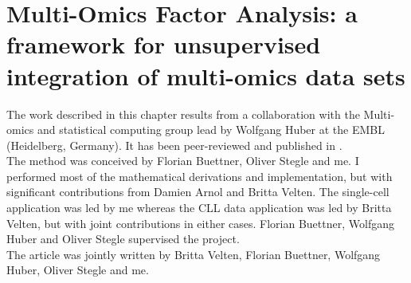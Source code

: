 \graphicspath{{Chapter2/Figs/}}

\section{Multi-Omics Factor Analysis: a framework for unsupervised integration of multi-omics data sets}

The work described in this chapter results from a collaboration with the Multi-omics and statistical computing group lead by Wolfgang Huber at the EMBL (Heidelberg, Germany). It has been peer-reviewed and published in \cite{Argelaguet2018}.\\

The method was conceived by Florian Buettner, Oliver Stegle and me. I performed most of the mathematical derivations and implementation, but with significant contributions from Damien Arnol and Britta Velten. The single-cell application was led by me whereas the CLL data application was led by Britta Velten, but with joint contributions in either cases. Florian Buettner, Wolfgang Huber and Oliver Stegle supervised the project.\\
The article was jointly written by Britta Velten, Florian Buettner, Wolfgang Huber, Oliver Stegle and me.


